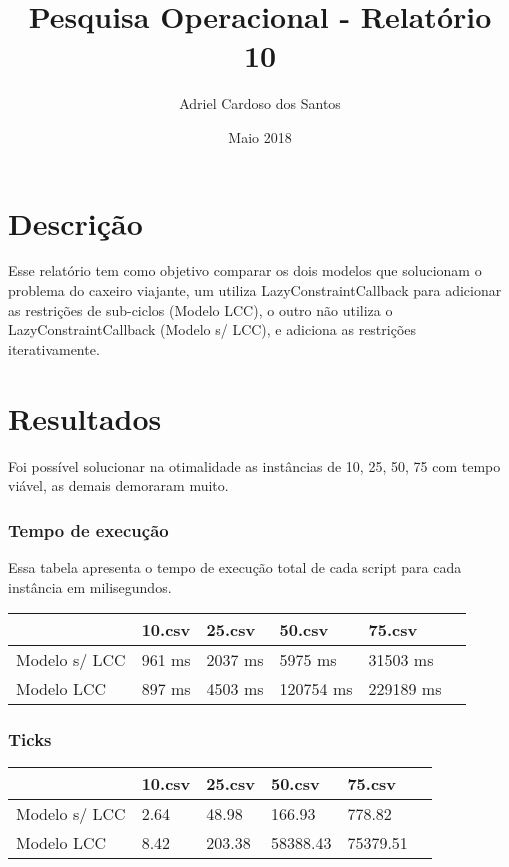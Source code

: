 \documentclass{article}
\title{Pesquisa Operacional - Relatório 10}
\author{Adriel Cardoso dos Santos}
\date{Maio 2018}
\begin{document}
    \maketitle

    \section{Descrição}

    Esse relatório tem como objetivo comparar os dois modelos que solucionam o problema do caxeiro viajante, um utiliza LazyConstraintCallback
    para adicionar as restrições de sub-ciclos (Modelo LCC), o outro não utiliza o LazyConstraintCallback (Modelo s/ LCC), e adiciona as restrições iterativamente.

    \section{Resultados}

    Foi possível solucionar na otimalidade as instâncias de 10, 25, 50, 75 com tempo viável, as demais demoraram muito.

    \subsubsection{Tempo de execução}
    Essa tabela apresenta o tempo de execução total de cada script para cada instância em milisegundos.
    \begin{center}
        \begin{tabular}{ | l | l | l | l | l | p{5cm} |}
            \hline
            & 10.csv & 25.csv & 50.csv & 75.csv \\ \hline
            Modelo s/ LCC & 961 ms & 2037 ms & 5975 ms & 31503 ms\\
            Modelo LCC & 897 ms & 4503 ms & 120754 ms & 229189 ms\\
            \hline
        \end{tabular}
    \end{center}

    \subsubsection{Ticks}

    \begin{center}
        \begin{tabular}{ | l | l | l | l | l | p{5cm} |}
            \hline
            & 10.csv & 25.csv & 50.csv & 75.csv \\ \hline
            Modelo s/ LCC & 2.64 & 48.98 & 166.93 & 778.82\\
            Modelo LCC & 8.42 & 203.38 & 58388.43 & 75379.51\\
            \hline
        \end{tabular}
    \end{center}
\end{document}
